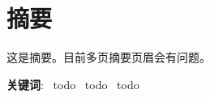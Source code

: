 \chapter{摘要}

这是摘要。目前多页摘要页眉会有问题。

\vspace{1em}
\setlength{\parindent}{0em}
\textbf{关键词}:~ todo~ todo~ todo
